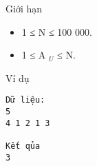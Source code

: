 Giới hạn
\begin{itemize}
	\item     1 ≤ N ≤ 100 000.   
	\item     1 ≤ A    $_     U    $    ≤ N.   
\end{itemize}
Ví dụ
\begin{verbatim}
Dữ liệu:
5
4 1 2 1 3

Kết qủa
3
\end{verbatim}